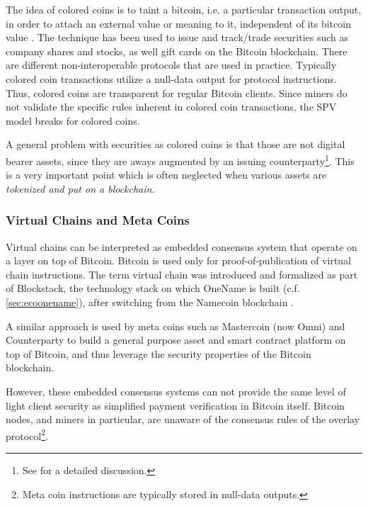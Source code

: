 The idea of colored coins is to taint a bitcoin, i.e. a particular transaction output, in order to attach an external value or meaning to it, independent of its bitcoin value \parencite{coloredcoins}. The technique has been used to issue and track/trade securities such as company shares and stocks, as well gift cards on the Bitcoin blockchain. There are different non-interoperable protocols that are used in practice. Typically colored coin transactions utilize a null-data output for protocol instructions. Thus, colored coins are transparent for regular Bitcoin clients. Since miners do not validate the specific rules inherent in colored coin transactions, the \ac{SPV} model breaks for colored coins.

A general problem with securities as colored coins is that those are not digital bearer assets, since they are aways augmented by an issuing counterparty\footnote{See \parencite{swanson2015} for a detailed discussion.}. This is a very important point which is often neglected when various assets are \emph{tokenized and put on a blockchain}.

\subsubsection{Virtual Chains and Meta Coins}

Virtual chains can be interpreted as embedded consensus system that operate on a layer on top of Bitcoin. Bitcoin is used only for proof-of-publication of virtual chain instructions. The term virtual chain was introduced and formalized as part of Blockstack, the technology stack on which OneName is built (c.f. \ref{sec:ecoonename}), after switching from the Namecoin blockchain \parencite{ali2016blockstack}. 

A similar approach is used by meta coins such as Mastercoin (now Omni) and Counterparty to build a general purpose asset and smart contract platform on top of Bitcoin, and thus leverage the security properties of the Bitcoin blockchain. 

However, these embedded consensus systems can not provide the same level of light client security as simplified payment verification in Bitcoin itself. Bitcoin nodes, and miners in particular, are unaware of the consensus rules of the overlay protocol\footnote{Meta coin instructions are typically stored in null-data outputs.}.

